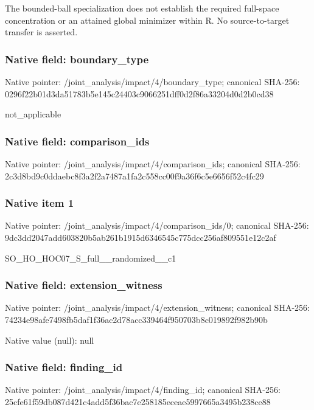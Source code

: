 \documentclass[10pt,a4paper]{article}
\begin{document}
\begingroup\raggedright\sloppy The bounded-ball specialization does not establish the required full-space concentration or an attained global minimizer within R. No source-to-target transfer is asserted.\par\endgroup

\subsubsection{Native field: boundary\_\allowbreak{}type}
Native pointer: /joint\_\allowbreak{}analysis/impact/4/boundary\_\allowbreak{}type; canonical SHA-256: 0296f22b01d3da51783b5e145c24403c9066251dff0d2f86a33204d0d2b0cd38

\begingroup\raggedright\sloppy not\_\allowbreak{}applicable\par\endgroup

\subsubsection{Native field: comparison\_\allowbreak{}ids}
Native pointer: /joint\_\allowbreak{}analysis/impact/4/comparison\_\allowbreak{}ids; canonical SHA-256: 2c3d8bd9c0ddaebc8f3a2f2a7487a1fa2c558cc00f9a36f6c5e6656f52c4fc29

\subsubsection{Native item 1}
Native pointer: /joint\_\allowbreak{}analysis/impact/4/comparison\_\allowbreak{}ids/0; canonical SHA-256: 9dc3dd2047add603820b5ab261b1915d6346545c775dcc256af809551e12c2af

\begingroup\raggedright\sloppy SO\_\allowbreak{}HO\_\allowbreak{}HOC07\_\allowbreak{}S\_\allowbreak{}full\_\allowbreak{}\_\allowbreak{}randomized\_\allowbreak{}\_\allowbreak{}c1\par\endgroup

\subsubsection{Native field: extension\_\allowbreak{}witness}
Native pointer: /joint\_\allowbreak{}analysis/impact/4/extension\_\allowbreak{}witness; canonical SHA-256: 74234e98afe7498fb5daf1f36ac2d78acc339464f950703b8c019892f982b90b

Native value (null): null

\subsubsection{Native field: finding\_\allowbreak{}id}
Native pointer: /joint\_\allowbreak{}analysis/impact/4/finding\_\allowbreak{}id; canonical SHA-256: 25cfe61f59db087d421c4add5f36bac7e258185eceae5997665a3495b238ce88
\end{document}
